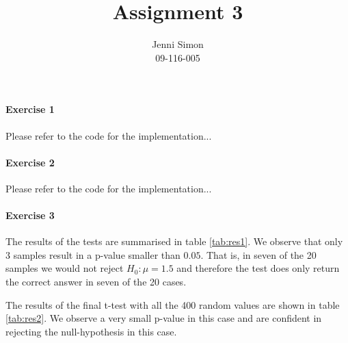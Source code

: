\documentclass{paper}
\title{Assignment 3}
\author{Jenni Simon\\09-116-005}
\begin{document}
\maketitle


%



\paragraph{Exercise 1}
Please refer to the code for the implementation...

\paragraph{Exercise 2}
Please refer to the code for the implementation...

\paragraph{Exercise 3}
The results of the tests are summarised in table \ref{tab:res1}.
We observe that only 3 samples result in a p-value smaller than $0.05$. That is, in seven of the 20 samples we would not reject $H_0: \mu=1.5$ and therefore the test does only return the correct answer in seven of the 20 cases.


The results of the final t-test with all the 400 random values are shown in table \ref{tab:res2}. We observe a very small p-value in this case and are confident in rejecting the null-hypothesis in this case.
\end{document}
